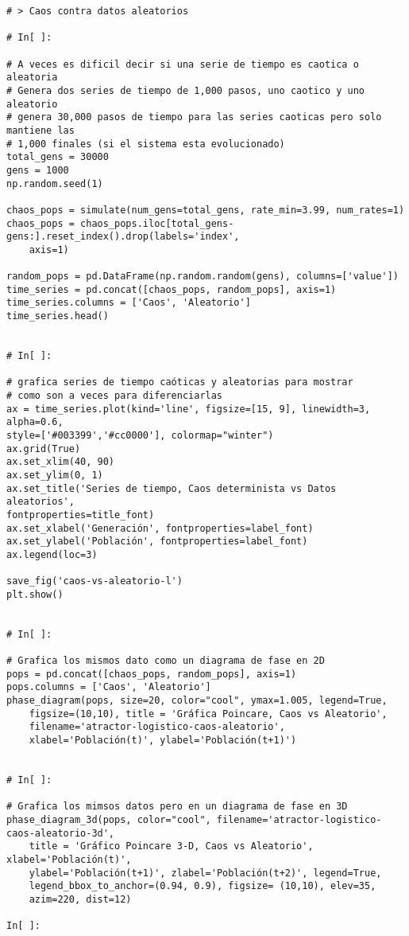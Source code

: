 \begin{verbatim}
# > Caos contra datos aleatorios

# In[ ]:

# A veces es dificil decir si una serie de tiempo es caotica o aleatoria
# Genera dos series de tiempo de 1,000 pasos, uno caotico y uno aleatorio
# genera 30,000 pasos de tiempo para las series caoticas pero solo mantiene las 
# 1,000 finales (si el sistema esta evolucionado)
total_gens = 30000
gens = 1000
np.random.seed(1)

chaos_pops = simulate(num_gens=total_gens, rate_min=3.99, num_rates=1)
chaos_pops = chaos_pops.iloc[total_gens-gens:].reset_index().drop(labels='index',
	axis=1)

random_pops = pd.DataFrame(np.random.random(gens), columns=['value'])
time_series = pd.concat([chaos_pops, random_pops], axis=1)
time_series.columns = ['Caos', 'Aleatorio']
time_series.head()


# In[ ]:

# grafica series de tiempo caóticas y aleatorias para mostrar 
# como son a veces para diferenciarlas 
ax = time_series.plot(kind='line', figsize=[15, 9], linewidth=3, alpha=0.6, 
style=['#003399','#cc0000'], colormap="winter")
ax.grid(True)
ax.set_xlim(40, 90)
ax.set_ylim(0, 1)
ax.set_title('Series de tiempo, Caos determinista vs Datos aleatorios', 
fontproperties=title_font)
ax.set_xlabel('Generación', fontproperties=label_font)
ax.set_ylabel('Población', fontproperties=label_font)
ax.legend(loc=3)

save_fig('caos-vs-aleatorio-l')
plt.show()


# In[ ]:

# Grafica los mismos dato como un diagrama de fase en 2D
pops = pd.concat([chaos_pops, random_pops], axis=1)
pops.columns = ['Caos', 'Aleatorio']
phase_diagram(pops, size=20, color="cool", ymax=1.005, legend=True, 
	figsize=(10,10), title = 'Gráfica Poincare, Caos vs Aleatorio',
    filename='atractor-logistico-caos-aleatorio',
    xlabel='Población(t)', ylabel='Población(t+1)')


# In[ ]:

# Grafica los mimsos datos pero en un diagrama de fase en 3D 
phase_diagram_3d(pops, color="cool", filename='atractor-logistico-caos-aleatorio-3d',
	title = 'Gráfico Poincare 3-D, Caos vs Aleatorio', xlabel='Población(t)',
	ylabel='Población(t+1)', zlabel='Población(t+2)', legend=True,
	legend_bbox_to_anchor=(0.94, 0.9), figsize= (10,10), elev=35, 
    azim=220, dist=12)

In[ ]:


\end{verbatim}
